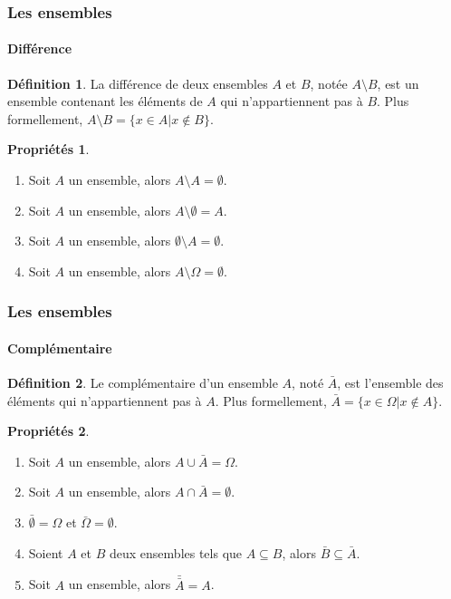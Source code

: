 \documentclass[10pt,notheorems]{beamer}
\theoremstyle{plain}
\theoremstyle{definition} %
\newtheorem{definition}{Définition}
\newtheorem{properties}{Propriétés}
\begin{document}
\begin{frame}
  \frametitle{Les ensembles}
  \framesubtitle{Différence}
  \hypertarget{slide_ensembles_difference}{}

  \begin{definition}\label{def:difference} La différence de deux ensembles $A$ et $B$, notée $A\setminus B$, est un ensemble contenant les éléments de $A$ qui n'appartiennent pas à $B$. Plus formellement, $A \setminus B = \{x\in A | x \notin B\}$.
  \end{definition}

  \bigskip

  \begin{properties}\label{properties:difference}
    \begin{enumerate}
    \item Soit $A$ un ensemble, alors $A\setminus A = \emptyset$.
    \item Soit $A$ un ensemble, alors $A\setminus \emptyset = A$.
    \item Soit $A$ un ensemble, alors $\emptyset \setminus A = \emptyset$.
    \item Soit $A$ un ensemble, alors $A\setminus\Omega = \emptyset$.
    \end{enumerate}
  \end{properties}

\end{frame}


\begin{frame}
  \frametitle{Les ensembles}
  \framesubtitle{Complémentaire}
  \hypertarget{slide_ensembles_complementaire}{}

  \begin{definition}\label{def:complementaire} Le complémentaire d'un ensemble $A$, noté $\bar A$, est l'ensemble des éléments qui n'appartiennent pas à $A$. Plus formellement, $\bar A = \{x\in\Omega|x\notin A\}$.
  \end{definition}

  \bigskip

  \begin{properties}\label{properties:complementaire}
    \begin{enumerate}
    \item Soit $A$ un ensemble, alors $A \cup \bar A = \Omega$.
    \item Soit $A$ un ensemble, alors $A \cap \bar A = \emptyset$.
    \item $\bar\emptyset = \Omega$ et $\bar\Omega = \emptyset$.
    \item Soient $A$ et $B$ deux ensembles tels que $A\subseteq B$, alors $\bar B \subseteq \bar A$.
    \item Soit $A$ un ensemble, alors $\bar{\bar A} = A$.
    \end{enumerate}
  \end{properties}

\end{frame}
\end{document}
